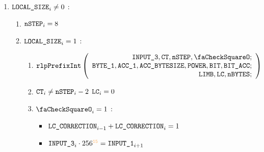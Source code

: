 \begin{description}
\begin{enumerate}[resume]
\begin{enumerate}
\begin{enumerate}
								\saNote{} the above expresses the requirement that there remain no more data to log for the present log entry. 
							\item \If $\phasesize_{i} \neq 0$ \Then we switch to the following subphase
								\[
									\left\{ \begin{array}{lclr}
										\Depth 1_{i + 1}   & = & 1 & (\trash) \\
										\isPrefix_{i + 1}  & = & 1 &          \\
										\isOt_{i + 1}      & = & 0 &          \\
										\isOd_{i + 1}      & = & 0 &          \\
									\end{array} \right.
								\]
								\saNote{} The above applies when there are remaining log entries for the present transaction. The next subphase is thus the beginning subphase of a new log entry.
							\item \If $\phasesize_{i}=0$ \Then $\phaseEnd_{i}=1$. \saNote{} This applies at the end of the \rlp{}-ization of the transaction receipt. 
						\end{enumerate}
					\item \If $\texttt{LOCAL\_SIZE}_{i} \neq 0$ \Then:
						\begin{enumerate}
							\item $\texttt{nSTEP}_{i}=8$
							\item \If $\texttt{LOCAL\_SIZE}_{i} = 1$ \Then:
								\begin{enumerate}
									\item 
										\[
											\rlpPrefixInt
											\left( \begin{array}{r}
												\Input3,
												\ct,
												\nbstep,
												\done; \\
												\byteCol1,
												\acc1,
												\accsize,
												\col{POWER},
												\col{BIT},
												\col{BIT\_ACC}; \\
												\limb,
												\lc,
												\limbsize; \\
											\end{array} \right)
										\]
									\item $\texttt{CT}_{i} \neq \texttt{nSTEP}_{i}-2$ \Then $\texttt{LC}_{i}=0$
									\item \If $\done_{i}=1$ \Then:
										\begin{itemize}
											\item $\texttt{LC\_CORRECTION}_{i-1} + \texttt{LC\_CORRECTION}_{i} = 1$
											\item $\Input3_{i} \cdot 256^{\llargeMO}= \Input1_{i+1}$

\end{itemize}
\end{enumerate}
\end{enumerate}
\end{enumerate}
\end{enumerate}
\end{description}

